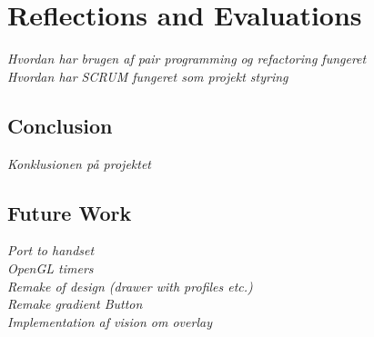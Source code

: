 \chapter{Reflections and Evaluations}
\textit{Hvordan har brugen af pair programming og refactoring fungeret\\
Hvordan har SCRUM fungeret som projekt styring\\
}
\section{Conclusion}
\textit{Konklusionen på projektet}

\section{Future Work}
\textit{Port to handset\\
OpenGL timers\\
Remake of design (drawer with profiles etc.)\\
Remake gradient Button\\
Implementation af vision om overlay\\}

